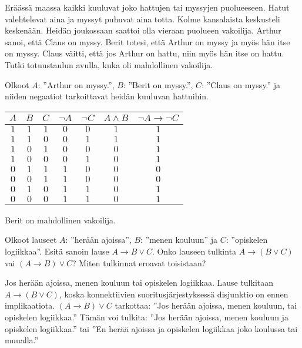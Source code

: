 \begin{tehtavasivu}
\begin{tehtava}
     Eräässä maassa kaikki kuuluvat joko hattujen tai myssyjen puolueeseen. Hatut valehtelevat aina ja myssyt puhuvat aina totta. Kolme kansalaista keskusteli keskenään. Heidän joukossaan saattoi olla vieraan puolueen vakoilija. Arthur sanoi, että Claus on myssy. Berit totesi, että Arthur on myssy ja myös hän itse on myssy. Claus väitti, että jos Arthur on hattu, niin myös hän itse on hattu. Tutki totuustaulun avulla, kuka oli mahdollinen vakoilija.
     \begin{vastaus} \newline
    Olkoot $A$: ''Arthur on myssy.'', $B$: ''Berit on myssy.'', $C$: ''Claus on myssy.'' ja niiden negaatiot tarkoittavat heidän kuuluvan hattuihin.
        \begin{center}
		    \begin{tabular}{|c|c|c|c|c|c|c|}\hline
		    $A$ & $B$ & $C$ & $\lnot A$ & $\lnot C$ & $A\land B$ & $\lnot A\to \lnot C$ \\ \hline
		    $1$ & $1$ & $1$ & $0$ & $0$ & $1$ & $1$ \\ %
		    $1$ & $1$ & $0$ & $0$ & $1$ & $1$ & $1$ \\
		    $1$ & $0$ & $1$ & $0$ & $0$ & $0$ & $1$ \\
		    $1$ & $0$ & $0$ & $0$ & $1$ & $0$ & $1$ \\
		    $0$ & $1$ & $1$ & $1$ & $0$ & $0$ & $0$ \\
		    $0$ & $0$ & $1$ & $1$ & $0$ & $0$ & $0$ \\
		    $0$ & $1$ & $0$ & $1$ & $1$ & $0$ & $1$ \\
		    $0$ & $0$ & $0$ & $1$ & $1$ & $0$ & $1$ \\ \hline
\end{tabular}
\end{center}
		Berit on mahdollinen vakoilija. %
    \end{vastaus}
    
\end{tehtava}

\begin{tehtava}
     Olkoot lauseet $A$: ''herään ajoissa'', $B$: ''menen kouluun'' ja $C$: ''opiskelen logiikkaa''.
     Esitä sanoin lause $A \to B \lor C$. Onko lauseen tulkinta $A \to (B \lor C)$ vai $(A \to B) \lor C$? Miten tulkinnat eroavat toisistaan? 
        \begin{vastaus} \newline
	 Jos herään ajoissa, menen kouluun tai opiskelen logiikkaa. Lause tulkitaan $A\to (B\lor C)$, koska konnektiivien suoritusjärjestyksessä disjunktio on ennen implikaatiota. $(A\to B)\lor C$ tarkottaa: ''Jos herään ajoissa, menen kouluun, tai opiskelen logiikkaa.'' Tämän voi tulkita: ''Jos herään ajoissa, menen kouluun ja opiskelen logiikkaa.'' tai ''En herää ajoissa ja opiskelen logiikkaa joko koulussa tai muualla.'' %
    \end{vastaus}
    

\end{tehtava}
\end{tehtavasivu}
